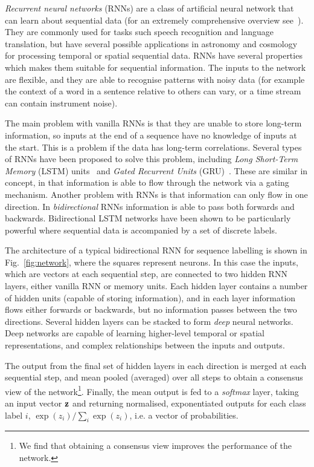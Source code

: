 \documentclass[twocolumn]{aastex61}
\begin{document}
{\em Recurrent neural networks} (RNNs) are a class of artificial neural network  that can learn about sequential data (for an extremely comprehensive overview see~\cite{medsker1999recurrent}). They are commonly used for tasks such speech recognition and language translation, but have several possible applications in astronomy  and cosmology for processing temporal or spatial sequential data. RNNs have several properties which makes them suitable for sequential information. The inputs to the network are flexible, and they are able to recognise patterns with noisy data (for example the context of a word in a sentence relative to others can vary, or a time stream can contain instrument noise). 

The main problem with vanilla RNNs  is that they are unable to store long-term information, so inputs at the end of a sequence have no knowledge of inputs at the start. This is a problem if the data has long-term correlations. Several types of RNNs have been proposed to solve this problem, including {\em Long Short-Term Memory} (LSTM) units~\cite{LSTM} and {\em Gated Recurrent Units} (GRU)~\cite{2014arXiv1412.3555C}. These are similar in concept, in that information is able to flow through the network via a gating mechanism. Another problem with RNNs is that information can only flow in one direction. In {\em bidirectional} RNNs information is able to pass both forwards and backwards. Bidirectional LSTM networks have been shown to be particularly powerful where sequential data is accompanied by a set of discrete labels. 

The architecture of a typical bidirectional RNN for sequence labelling is shown in Fig.~\ref{fig:network}, where the squares represent {\rm neurons}. In this case the inputs, which are vectors at each sequential step, are connected to two hidden RNN layers, either vanilla RNN or memory units.  Each hidden layer contains a number of hidden units (capable of storing information), and in each layer information flows either forwards or backwards,  but no information passes between the two directions. Several hidden layers can be stacked to form {\em deep} neural networks. Deep networks are capable of learning higher-level temporal or spatial representations, and complex relationships between the inputs and outputs.

The output from the final set of hidden layers in each direction is merged at each sequential step, and mean pooled (averaged) over all steps to obtain a consensus view of the network\footnote{We find that obtaining a consensus view improves the performance of the network.}. Finally, the mean output is fed to a {\em softmax} layer, taking an input vector ${\bf z}$ and returning normalised, exponentiated outputs for each class label $i$, $\exp(z_i) / \sum_{i} \exp(z_i)$, i.e. a vector of probabilities.
\end{document}
